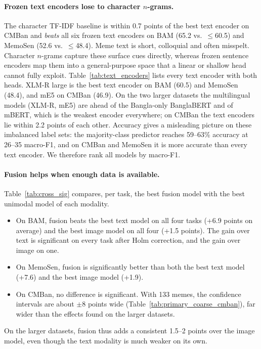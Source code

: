 \paragraph{Frozen text encoders lose to character $n$-grams.} The character TF-IDF baseline is within 0.7 points
of the best text encoder on CMBan and \emph{beats} all six frozen text encoders on BAM (65.2 vs.\ $\leq$60.5) and
MemoSen (52.6 vs.\ $\leq$48.4). Meme text is short, colloquial and often misspelt. Character $n$-grams capture
these surface cues directly, whereas frozen sentence encoders map them into a general-purpose space that a linear or
shallow head cannot fully exploit. Table~\ref{tab:text_encoders} lists every text encoder with both heads. XLM-R large
is the best text encoder on BAM (60.5) and MemoSen (48.4), and mE5 on CMBan (46.9). On the two larger datasets the
multilingual models (XLM-R, mE5) are ahead of the Bangla-only BanglaBERT and of mBERT, which is the weakest encoder
everywhere; on CMBan the text encoders lie within 2.2 points of each other. Accuracy gives a misleading picture on
these imbalanced label sets: the majority-class predictor reaches 59--63\% accuracy at 26--35 macro-F1, and on CMBan
and MemoSen it is more accurate than every text encoder. We therefore rank all models by macro-F1.



\paragraph{Fusion helps when enough data is available.} Table~\ref{tab:cross_sig} compares, per task, the best
fusion model with the best unimodal model of each modality.
\begin{itemize}
  \item On BAM, fusion beats the best text model on all four tasks (+6.9 points on average) and the best image model
  on all four (+1.5 points). The gain over text is significant on every task after Holm correction, and the gain
  over image on one.
  \item On MemoSen, fusion is significantly better than both the best text model (+7.6) and the best image model
  (+1.9).
  \item On CMBan, no difference is significant. With 133 memes, the confidence intervals are about $\pm$8 points
  wide (Table~\ref{tab:primary_coarse_cmban}), far wider than the effects found on the larger datasets.
\end{itemize}
On the larger datasets, fusion thus adds a consistent 1.5--2 points over the image model, even though the text
modality is much weaker on its own.

